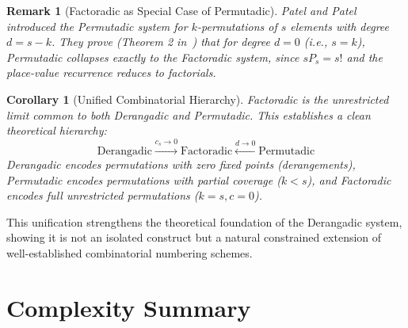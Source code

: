 \documentclass[11pt,a4paper]{article}
\newtheorem{corollary}[theorem]{Corollary}
\newtheorem{remark}{Remark}[section]
\begin{document}
    \begin{remark}[Factoradic as Special Case of Permutadic]
        Patel and Patel~\cite{permutadic} introduced the Permutadic system for
        $k$-permutations of $s$ elements with degree $d = s-k$. They prove
        (Theorem 2 in~\cite{permutadic}) that for degree $d=0$ (i.e., $s=k$),
        Permutadic collapses exactly to the Factoradic system, since $sP_s = s!$
        and the place-value recurrence reduces to factorials.
    \end{remark}

    \begin{corollary}[Unified Combinatorial Hierarchy]
        \label{cor:unified-hierarchy}
        Factoradic is the unrestricted limit common to both Derangadic and
        Permutadic. This establishes a clean theoretical hierarchy:
        \[
            \text{Derangadic} \xrightarrow{c_s \to 0} \text{Factoradic} \xleftarrow{d \to 0} \text{Permutadic}
        \]
        Derangadic encodes permutations with \emph{zero} fixed points (derangements),
        Permutadic encodes permutations with \emph{partial} coverage ($k < s$), and
        Factoradic encodes \emph{full} unrestricted permutations ($k=s, c=0$).
    \end{corollary}

    This unification strengthens the theoretical foundation of the Derangadic
    system, showing it is not an isolated construct but a natural constrained
    extension of well-established combinatorial numbering schemes.

    \section{Complexity Summary}
    \label{sec:complexity}
\end{document}
